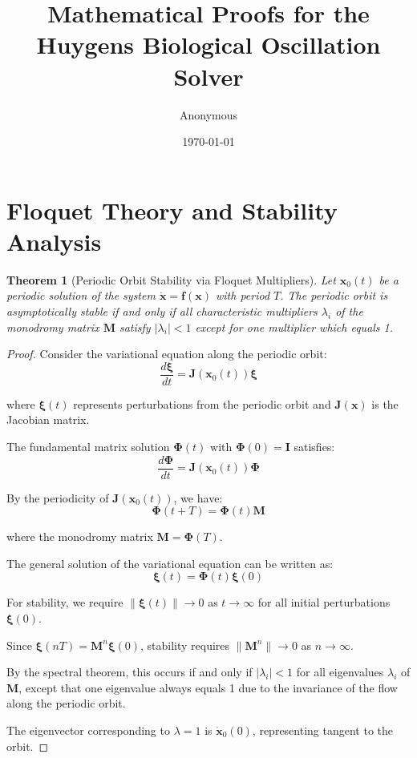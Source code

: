 \documentclass{article}
\title{Mathematical Proofs for the Huygens Biological Oscillation Solver}
\author{Anonymous}
\date{\today}
\newtheorem{theorem}{Theorem}
\begin{document}
\maketitle

\section{Floquet Theory and Stability Analysis}

\begin{theorem}[Periodic Orbit Stability via Floquet Multipliers]
Let $\mathbf{x}_0(t)$ be a periodic solution of the system $\dot{\mathbf{x}} = \mathbf{f}(\mathbf{x})$ with period $T$. The periodic orbit is asymptotically stable if and only if all characteristic multipliers $\lambda_i$ of the monodromy matrix $\mathbf{M}$ satisfy $|\lambda_i| < 1$ except for one multiplier which equals 1.
\end{theorem}

\begin{proof}
Consider the variational equation along the periodic orbit:
\begin{equation}
\frac{d\boldsymbol{\xi}}{dt} = \mathbf{J}(\mathbf{x}_0(t))\boldsymbol{\xi}
\end{equation}

where $\boldsymbol{\xi}(t)$ represents perturbations from the periodic orbit and $\mathbf{J}(\mathbf{x})$ is the Jacobian matrix.

The fundamental matrix solution $\boldsymbol{\Phi}(t)$ with $\boldsymbol{\Phi}(0) = \mathbf{I}$ satisfies:
\begin{equation}
\frac{d\boldsymbol{\Phi}}{dt} = \mathbf{J}(\mathbf{x}_0(t))\boldsymbol{\Phi}
\end{equation}

By the periodicity of $\mathbf{J}(\mathbf{x}_0(t))$, we have:
\begin{equation}
\boldsymbol{\Phi}(t+T) = \boldsymbol{\Phi}(t)\mathbf{M}
\end{equation}

where the monodromy matrix $\mathbf{M} = \boldsymbol{\Phi}(T)$.

The general solution of the variational equation can be written as:
\begin{equation}
\boldsymbol{\xi}(t) = \boldsymbol{\Phi}(t)\boldsymbol{\xi}(0)
\end{equation}

For stability, we require $\|\boldsymbol{\xi}(t)\| \to 0$ as $t \to \infty$ for all initial perturbations $\boldsymbol{\xi}(0)$.

Since $\boldsymbol{\xi}(nT) = \mathbf{M}^n\boldsymbol{\xi}(0)$, stability requires $\|\mathbf{M}^n\| \to 0$ as $n \to \infty$.

By the spectral theorem, this occurs if and only if $|\lambda_i| < 1$ for all eigenvalues $\lambda_i$ of $\mathbf{M}$, except that one eigenvalue always equals 1 due to the invariance of the flow along the periodic orbit.

The eigenvector corresponding to $\lambda = 1$ is $\dot{\mathbf{x}}_0(0)$, representing tangent to the orbit.
\end{proof}
\end{document}
